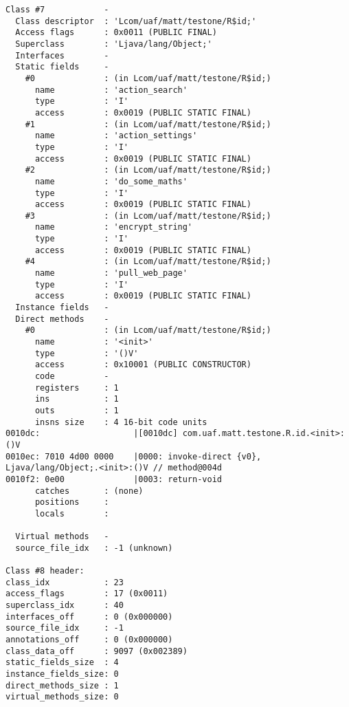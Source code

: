 \begin{lstlisting}
Class #7            -
  Class descriptor  : 'Lcom/uaf/matt/testone/R$id;'
  Access flags      : 0x0011 (PUBLIC FINAL)
  Superclass        : 'Ljava/lang/Object;'
  Interfaces        -
  Static fields     -
    #0              : (in Lcom/uaf/matt/testone/R$id;)
      name          : 'action_search'
      type          : 'I'
      access        : 0x0019 (PUBLIC STATIC FINAL)
    #1              : (in Lcom/uaf/matt/testone/R$id;)
      name          : 'action_settings'
      type          : 'I'
      access        : 0x0019 (PUBLIC STATIC FINAL)
    #2              : (in Lcom/uaf/matt/testone/R$id;)
      name          : 'do_some_maths'
      type          : 'I'
      access        : 0x0019 (PUBLIC STATIC FINAL)
    #3              : (in Lcom/uaf/matt/testone/R$id;)
      name          : 'encrypt_string'
      type          : 'I'
      access        : 0x0019 (PUBLIC STATIC FINAL)
    #4              : (in Lcom/uaf/matt/testone/R$id;)
      name          : 'pull_web_page'
      type          : 'I'
      access        : 0x0019 (PUBLIC STATIC FINAL)
  Instance fields   -
  Direct methods    -
    #0              : (in Lcom/uaf/matt/testone/R$id;)
      name          : '<init>'
      type          : '()V'
      access        : 0x10001 (PUBLIC CONSTRUCTOR)
      code          -
      registers     : 1
      ins           : 1
      outs          : 1
      insns size    : 4 16-bit code units
0010dc:                   |[0010dc] com.uaf.matt.testone.R.id.<init>:()V
0010ec: 7010 4d00 0000    |0000: invoke-direct {v0}, Ljava/lang/Object;.<init>:()V // method@004d
0010f2: 0e00              |0003: return-void
      catches       : (none)
      positions     :
      locals        :

  Virtual methods   -
  source_file_idx   : -1 (unknown)

Class #8 header:
class_idx           : 23
access_flags        : 17 (0x0011)
superclass_idx      : 40
interfaces_off      : 0 (0x000000)
source_file_idx     : -1
annotations_off     : 0 (0x000000)
class_data_off      : 9097 (0x002389)
static_fields_size  : 4
instance_fields_size: 0
direct_methods_size : 1
virtual_methods_size: 0


\end{lstlisting}
